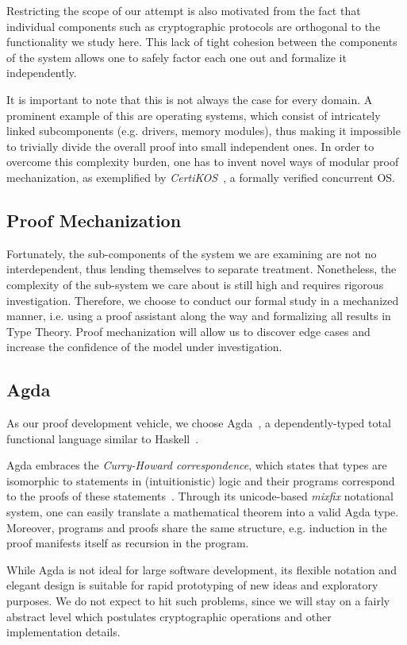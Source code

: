 \documentclass[acmsmall,nonacm=true,screen=true]{acmart}
\begin{document}
Restricting the scope of our attempt is also motivated from the fact that individual
components such as cryptographic protocols are orthogonal to the functionality we study here.
This lack of tight cohesion between the components of the system allows one to 
safely factor each one out and formalize it independently.

It is important to note that this is not always the case for every domain. A prominent example of
this are operating systems, which consist of intricately linked subcomponents (e.g. drivers, memory modules),
thus making it impossible to trivially divide the overall proof into small independent ones.
In order to overcome this complexity burden, one has to invent novel ways of modular proof mechanization, as
exemplified by \textit{CertiKOS}~\cite{certikos}, a formally verified concurrent OS.

\subsection{Proof Mechanization}
Fortunately, the sub-components of the system we are examining are not no interdependent,
thus lending themselves to separate treatment.
Nonetheless, the complexity of the sub-system we care about is still high and requires rigorous investigation.
Therefore, we choose to conduct our formal study in a mechanized manner, i.e. using a proof assistant
along the way and formalizing all results in Type Theory.
Proof mechanization will allow us to discover edge cases and increase the confidence of the model under investigation.

\subsection{Agda}
As our proof development vehicle, we choose Agda~\cite{agda}, a dependently-typed total functional language
similar to Haskell~\cite{haskell}.

Agda embraces the \textit{Curry-Howard correspondence}, which states that types are isomorphic to statements in
(intuitionistic) logic and their programs correspond to the proofs of these statements~\cite{itt}.
Through its unicode-based \textit{mixfix} notational system, one can easily translate a mathematical theorem
into a valid Agda type.
Moreover, programs and proofs share the same structure, e.g. induction
in the proof manifests itself as recursion in the program.

While Agda is not ideal for large software development, its flexible notation
and elegant design is suitable for rapid prototyping of new ideas and exploratory purposes.
We do not expect to hit such problems,
since we will stay on a fairly abstract level which postulates cryptographic operations and other implementation details.
\end{document}
